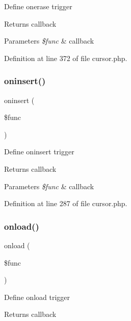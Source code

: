 Define onerase trigger \begin{DoxyReturn}{Returns}
callback 
\end{DoxyReturn}

\begin{DoxyParams}{Parameters}
{\em \$func} & callback \\
\hline
\end{DoxyParams}


Definition at line 372 of file cursor.\+php.

\hypertarget{class_d_b_1_1_cursor_ab3ebd70359a4d0916e07bc3523099fff}{}\label{class_d_b_1_1_cursor_ab3ebd70359a4d0916e07bc3523099fff} 
\subsubsection{\texorpdfstring{oninsert()}{oninsert()}}
{\footnotesize\ttfamily oninsert (\begin{DoxyParamCaption}\item[{}]{\$func }\end{DoxyParamCaption})}

Define oninsert trigger \begin{DoxyReturn}{Returns}
callback 
\end{DoxyReturn}

\begin{DoxyParams}{Parameters}
{\em \$func} & callback \\
\hline
\end{DoxyParams}


Definition at line 287 of file cursor.\+php.

\hypertarget{class_d_b_1_1_cursor_a7615e052068ed5e2c78a87f9b562f98e}{}\label{class_d_b_1_1_cursor_a7615e052068ed5e2c78a87f9b562f98e} 
\subsubsection{\texorpdfstring{onload()}{onload()}}
{\footnotesize\ttfamily onload (\begin{DoxyParamCaption}\item[{}]{\$func }\end{DoxyParamCaption})}

Define onload trigger \begin{DoxyReturn}{Returns}
callback 
\end{DoxyReturn}

